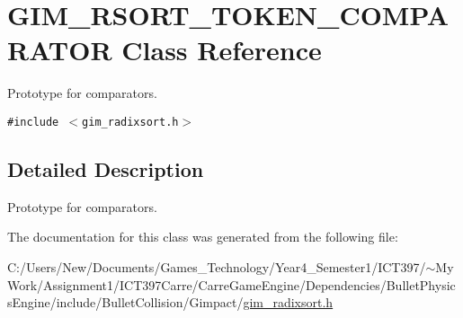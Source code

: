 \hypertarget{class_g_i_m___r_s_o_r_t___t_o_k_e_n___c_o_m_p_a_r_a_t_o_r}{
\section{GIM\_\-RSORT\_\-TOKEN\_\-COMPARATOR Class Reference}
\label{class_g_i_m___r_s_o_r_t___t_o_k_e_n___c_o_m_p_a_r_a_t_o_r}
}
Prototype for comparators.  


{\tt \#include $<$gim\_\-radixsort.h$>$}



\subsection{Detailed Description}
Prototype for comparators. 

The documentation for this class was generated from the following file:\begin{CompactItemize}
\item 
C:/Users/New/Documents/Games\_\-Technology/Year4\_\-Semester1/ICT397/$\sim$My Work/Assignment1/ICT397Carre/CarreGameEngine/Dependencies/BulletPhysicsEngine/include/BulletCollision/Gimpact/\hyperlink{gim__radixsort_8h}{gim\_\-radixsort.h}\end{CompactItemize}
